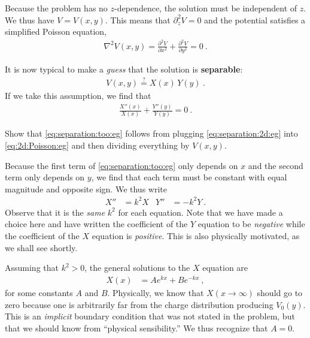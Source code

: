\documentclass[12pt, oneside]{report}    %
\begin{document}
Because the problem has no $z$-dependence, the solution must be independent of $z$. We thus have $V=V(x,y)$. This means that $\partial_z^2 V = 0$ and the potential satisfies a simplified Poisson equation,
\begin{align}
    \nabla^2 V(x,y) = 
    \frac{\partial^2V}{\partial x^2}
    +
    \frac{\partial^2V}{\partial y^2}
    = 0 \ .
    \label{eq:2d:Poisson:eg}
\end{align}

It is now typical to make a \emph{guess} that the solution is \textbf{separable}:
\begin{align}
    V(x,y) \stackrel{?}{=} X(x) \, Y(y)
    \ .
    \label{eq:separation:2d:eg}
\end{align}
If we take this assumption, we find that
\begin{align}
    \frac{X''(x)}{X(x)} + \frac{Y''(y)}{Y(y)} = 0 \ .
    \label{eq:separation:too:eg}
\end{align}
\begin{exercise}
Show that \eqref{eq:separation:too:eg} follows from plugging \eqref{eq:separation:2d:eg} into \eqref{eq:2d:Poisson:eg} and then dividing everything by $V(x,y)$.
\end{exercise}
Because the first term of \eqref{eq:separation:too:eg}  only depends on $x$ and the second term only depends on $y$, we find that each term must be constant with equal magnitude and opposite sign. We thus write
\begin{align}
    X'' &= k^2X & Y''&= -k^2 Y \ .
    \label{eq:two:equations}
\end{align}
Observe that it is the \emph{same} $k^2$ for each equation.
% 
Note that we have made a choice here and have written the coefficient of the $Y$ equation to be \emph{negative} while the coefficient of the $X$ equation is \emph{positive}. This is also physically motivated, as we shall see shortly.

Assuming that $k^2>0$, the general solutions to the $X$ equation are
\begin{align}
    X(x) &= Ae^{kx} + Be^{-kx} \ ,
\end{align}
for some constants $A$ and $B$. Physically, we know that $X(x\to\infty)$ should go to zero because one is arbitrarily far from the charge distribution producing $V_0(y)$. This is an \emph{implicit} boundary condition that was not stated in the problem, but that we should know from ``physical sensibility.'' We thus recognize that $A=0$.
\end{document}
